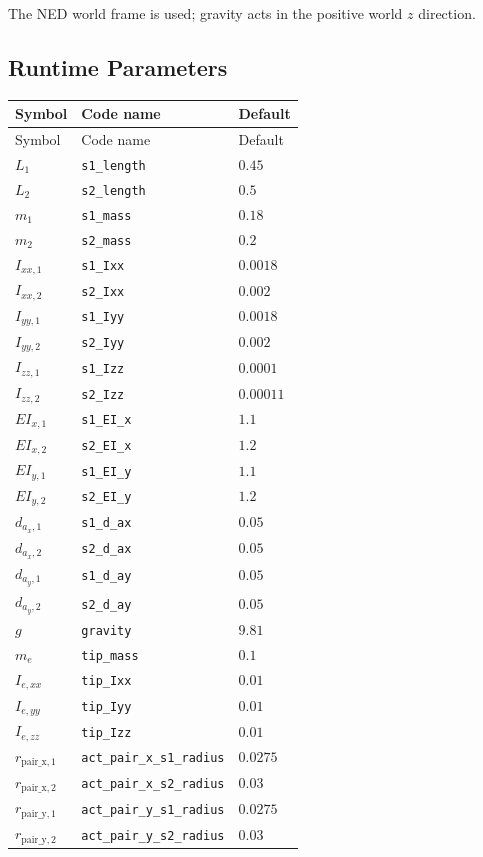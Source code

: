 \documentclass[11pt]{article}
\begin{document}
The NED world frame is used; gravity acts in the positive world $z$ direction.
\subsection{Runtime Parameters}
\begin{longtable}{lll}
\hline
Symbol & Code name & Default \\
\hline
\endfirsthead
\hline Symbol & Code name & Default \\
\hline
\endhead
$L_{1}$ & \texttt{s1\_length} & $0.45$ \\
$L_{2}$ & \texttt{s2\_length} & $0.5$ \\
$m_{1}$ & \texttt{s1\_mass} & $0.18$ \\
$m_{2}$ & \texttt{s2\_mass} & $0.2$ \\
$I_{xx,1}$ & \texttt{s1\_Ixx} & $0.0018$ \\
$I_{xx,2}$ & \texttt{s2\_Ixx} & $0.002$ \\
$I_{yy,1}$ & \texttt{s1\_Iyy} & $0.0018$ \\
$I_{yy,2}$ & \texttt{s2\_Iyy} & $0.002$ \\
$I_{zz,1}$ & \texttt{s1\_Izz} & $0.0001$ \\
$I_{zz,2}$ & \texttt{s2\_Izz} & $0.00011$ \\
$EI_{x,1}$ & \texttt{s1\_EI\_x} & $1.1$ \\
$EI_{x,2}$ & \texttt{s2\_EI\_x} & $1.2$ \\
$EI_{y,1}$ & \texttt{s1\_EI\_y} & $1.1$ \\
$EI_{y,2}$ & \texttt{s2\_EI\_y} & $1.2$ \\
$d_{a_x,1}$ & \texttt{s1\_d\_ax} & $0.05$ \\
$d_{a_x,2}$ & \texttt{s2\_d\_ax} & $0.05$ \\
$d_{a_y,1}$ & \texttt{s1\_d\_ay} & $0.05$ \\
$d_{a_y,2}$ & \texttt{s2\_d\_ay} & $0.05$ \\
$g$ & \texttt{gravity} & $9.81$ \\
$m_e$ & \texttt{tip\_mass} & $0.1$ \\
$I_{e,xx}$ & \texttt{tip\_Ixx} & $0.01$ \\
$I_{e,yy}$ & \texttt{tip\_Iyy} & $0.01$ \\
$I_{e,zz}$ & \texttt{tip\_Izz} & $0.01$ \\
$r_{\mathrm{pair\_x},1}$ & \texttt{act\_pair\_x\_s1\_radius} & $0.0275$ \\
$r_{\mathrm{pair\_x},2}$ & \texttt{act\_pair\_x\_s2\_radius} & $0.03$ \\
$r_{\mathrm{pair\_y},1}$ & \texttt{act\_pair\_y\_s1\_radius} & $0.0275$ \\
$r_{\mathrm{pair\_y},2}$ & \texttt{act\_pair\_y\_s2\_radius} & $0.03$ \\
\hline
\end{longtable}
\end{document}
